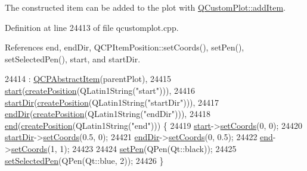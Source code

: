 The constructed item can be added to the plot with \hyperlink{class_q_custom_plot_aa500620379262321685cb7a7674cbd2a}{Q\+Custom\+Plot\+::add\+Item}. 

Definition at line 24413 of file qcustomplot.\+cpp.



References end, end\+Dir, Q\+C\+P\+Item\+Position\+::set\+Coords(), set\+Pen(), set\+Selected\+Pen(), start, and start\+Dir.


\begin{DoxyCode}
24414     : \hyperlink{class_q_c_p_abstract_item_a9922507d8b4503a1fe1ed0b1030e23b6}{QCPAbstractItem}(parentPlot),
24415       \hyperlink{class_q_c_p_item_curve_a20c3b5ea31c33764f4f30c2ec7ae518b}{start}(\hyperlink{class_q_c_p_abstract_item_a75036d39c4d4e2e1a7dd145fff915d32}{createPosition}(QLatin1String(\textcolor{stringliteral}{"start"}))),
24416       \hyperlink{class_q_c_p_item_curve_aa124bf66c09cc51c627fb49db8bf8a7b}{startDir}(\hyperlink{class_q_c_p_abstract_item_a75036d39c4d4e2e1a7dd145fff915d32}{createPosition}(QLatin1String(\textcolor{stringliteral}{"startDir"}))),
24417       \hyperlink{class_q_c_p_item_curve_a28181a9dee9cc3c3da83a883221bd2d0}{endDir}(\hyperlink{class_q_c_p_abstract_item_a75036d39c4d4e2e1a7dd145fff915d32}{createPosition}(QLatin1String(\textcolor{stringliteral}{"endDir"}))),
24418       \hyperlink{class_q_c_p_item_curve_a24ecbb195b32a08b42b61c2cf08a1b4d}{end}(\hyperlink{class_q_c_p_abstract_item_a75036d39c4d4e2e1a7dd145fff915d32}{createPosition}(QLatin1String(\textcolor{stringliteral}{"end"}))) \{
24419   \hyperlink{class_q_c_p_item_curve_a20c3b5ea31c33764f4f30c2ec7ae518b}{start}->\hyperlink{class_q_c_p_item_position_aa988ba4e87ab684c9021017dcaba945f}{setCoords}(0, 0);
24420   \hyperlink{class_q_c_p_item_curve_aa124bf66c09cc51c627fb49db8bf8a7b}{startDir}->\hyperlink{class_q_c_p_item_position_aa988ba4e87ab684c9021017dcaba945f}{setCoords}(0.5, 0);
24421   \hyperlink{class_q_c_p_item_curve_a28181a9dee9cc3c3da83a883221bd2d0}{endDir}->\hyperlink{class_q_c_p_item_position_aa988ba4e87ab684c9021017dcaba945f}{setCoords}(0, 0.5);
24422   \hyperlink{class_q_c_p_item_curve_a24ecbb195b32a08b42b61c2cf08a1b4d}{end}->\hyperlink{class_q_c_p_item_position_aa988ba4e87ab684c9021017dcaba945f}{setCoords}(1, 1);
24423 
24424   \hyperlink{class_q_c_p_item_curve_a034be908440aec785c34b92843461221}{setPen}(QPen(Qt::black));
24425   \hyperlink{class_q_c_p_item_curve_a375b917669f868c5a106bf2f1ab7c26d}{setSelectedPen}(QPen(Qt::blue, 2));
24426 \}
\end{DoxyCode}


